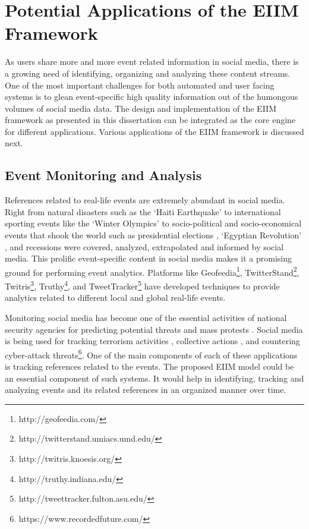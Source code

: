 
\chapter{Potential Applications of the EIIM Framework} %
\thispagestyle{fancy}
\label{applications} %

\doublespacing
\setlength{\parindent}{1cm}

As users share more and more event related information in social media, there is a growing need of identifying, organizing and analyzing these content streams. One of the most important challenges for both automated and user facing systems is to glean event-specific high quality information out of the humongous volumes of social media data. The design and implementation of the EIIM framework as presented in this dissertation can be integrated as the core engine for different applications. Various applications of the EIIM framework is discussed next.


\section{Event Monitoring and Analysis}
References related to real-life events are extremely abundant in social media. Right from natural disasters such as the `Haiti Earthquake' \cite{gao2011harnessing} to international sporting events like the `Winter Olympics' \cite{walker2013russia} to socio-political \cite{singh2010mining} and socio-economical \cite{bollen2009modeling} events that shook the world such as presidential elections \cite{metzgar2009social}, `Egyptian Revolution' \cite{choudhary2012social}, and recessions were covered, analyzed, extrapolated and informed by social media. This prolific event-specific content in social media makes it a promising ground for performing event analytics. Platforms like Geofeedia\footnote{http://geofeedia.com/}, TwitterStand\footnote{http://twitterstand.umiacs.umd.edu/}, Twitris\footnote{http://twitris.knoesis.org/}, Truthy\footnote{http://truthy.indiana.edu/}, and TweetTracker\footnote{http://tweettracker.fulton.asu.edu/}  have developed techniques to provide analytics related to different local and global real-life events. 

Monitoring social media has become one of the essential activities of national security agencies for predicting potential threats and mass protests \cite{ghannam2011social}. Social media is being used for tracking terrorism activities \cite{oh2011information}, collective actions \cite{agarwal2014online}, and countering cyber-attack threats\footnote{https://www.recordedfuture.com/}. One of the main components of each of these applications is tracking references related to the events. The proposed EIIM model could be an essential component of such systems. It would help in identifying, tracking and analyzing events and its related references in an organized manner over time.



